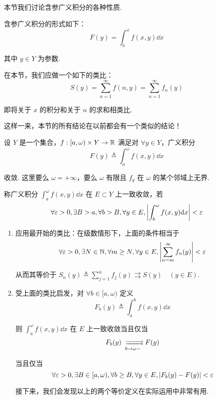 本节我们讨论含参广义积分的各种性质.

含参广义积分的形式如下：
$$
F(y)=\int_a^\omega f(x,y)\dd x
$$

其中 $y\in Y$ 为参数.

在本节，我们应做一个如下的类比：
$$
S(y)=\sum_{n=1}^\infty f(n,y)=\sum_{n=1}^\infty f_n(y)
$$

即将关于 $x$ 的积分和关于 $n$ 的求和相类比.

这样一来，本节的所有结论在以前都会有一个类似的结论！



设 $Y$ 是一个集合，$f:[a,\omega)\times Y\to\mathbb{R}$ 满足对 $\forall y\in Y$，广义积分
$$
F(y)\triangleq\int_a^\omega f(x,y)\dd x
$$

收敛. 这里要么 $\omega=+\infty$，要么 $\omega$ 有限且 $f_y$ 在 $\omega$ 的某个邻域上无界.

\begin{definition}
    称广义积分 $\displaystyle\int_a^\omega f(x,y)\dd x$ 在 $E\subset Y$ 上一致收敛，若
$$
\forall\varepsilon>0,\exists B>a,\forall b>B,\forall y\in E,\left\lvert{\int_b^\omega f(x,y)\mathrm{d}x}\right\rvert<\varepsilon
$$
\end{definition}

\begin{hint}
    \begin{enumerate}
        \item 应用最开始的类比：在级数情形下，上面的条件相当于
$$
\forall\varepsilon>0,\exists N\in\mathbb{N},\forall m\ge N,\forall y\in E,\left\lvert{\sum_{n=m}^\infty f_n(y)}\right\rvert<\varepsilon
$$

        从而其等价于 $S_n(y)\triangleq\displaystyle\sum_{j=1}^nf_j(y)\rightrightarrows S(y)\quad(y\in E)$.

        \item 受上面的类比启发，对 $\forall b\in[a,\omega)$ 定义
$$
F_b(y)\triangleq\int_a^bf(x,y)\dd x
$$

        则 $\displaystyle\int_a^\omega f(x,y)\dd x$ 在 $E$ 上一致收敛当且仅当
$$
F_b(y)\xrightrightarrows[b\to\omega-]{}F(y)
$$

        当且仅当
$$
\forall\varepsilon>0,\exists B\in[a,\omega),\forall b\ge B,\forall y\in E,\left\lvert{F_b(y)-F(y)}\right\rvert<\varepsilon
$$

        接下来，我们会发现以上的两个等价定义在实际运用中非常有用.
    \end{enumerate}
\end{hint}

